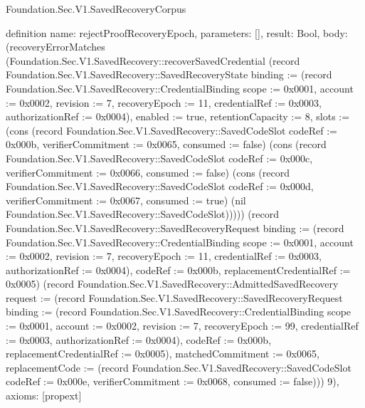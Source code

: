 \begin{lexlean}{Foundation.Sec.V1.SavedRecoveryCorpus}
\begin{semanticmodule}
definition{
  name: rejectProofRecoveryEpoch,
  parameters: [],
  result: Bool,
  body: (recoveryErrorMatches (Foundation.Sec.V1.SavedRecovery::recoverSavedCredential (record Foundation.Sec.V1.SavedRecovery::SavedRecoveryState {binding := (record Foundation.Sec.V1.SavedRecovery::CredentialBinding {scope := 0x0001, account := 0x0002, revision := 7, recoveryEpoch := 11, credentialRef := 0x0003, authorizationRef := 0x0004}), enabled := true, retentionCapacity := 8, slots := (cons (record Foundation.Sec.V1.SavedRecovery::SavedCodeSlot {codeRef := 0x000b, verifierCommitment := 0x0065, consumed := false}) (cons (record Foundation.Sec.V1.SavedRecovery::SavedCodeSlot {codeRef := 0x000c, verifierCommitment := 0x0066, consumed := false}) (cons (record Foundation.Sec.V1.SavedRecovery::SavedCodeSlot {codeRef := 0x000d, verifierCommitment := 0x0067, consumed := true}) (nil Foundation.Sec.V1.SavedRecovery::SavedCodeSlot))))}) (record Foundation.Sec.V1.SavedRecovery::SavedRecoveryRequest {binding := (record Foundation.Sec.V1.SavedRecovery::CredentialBinding {scope := 0x0001, account := 0x0002, revision := 7, recoveryEpoch := 11, credentialRef := 0x0003, authorizationRef := 0x0004}), codeRef := 0x000b, replacementCredentialRef := 0x0005}) (record Foundation.Sec.V1.SavedRecovery::AdmittedSavedRecovery {request := (record Foundation.Sec.V1.SavedRecovery::SavedRecoveryRequest {binding := (record Foundation.Sec.V1.SavedRecovery::CredentialBinding {scope := 0x0001, account := 0x0002, revision := 7, recoveryEpoch := 99, credentialRef := 0x0003, authorizationRef := 0x0004}), codeRef := 0x000b, replacementCredentialRef := 0x0005}), matchedCommitment := 0x0065, replacementCode := (record Foundation.Sec.V1.SavedRecovery::SavedCodeSlot {codeRef := 0x000e, verifierCommitment := 0x0068, consumed := false})})) 9),
  axioms: [propext]
}


\end{semanticmodule}
\end{lexlean}
